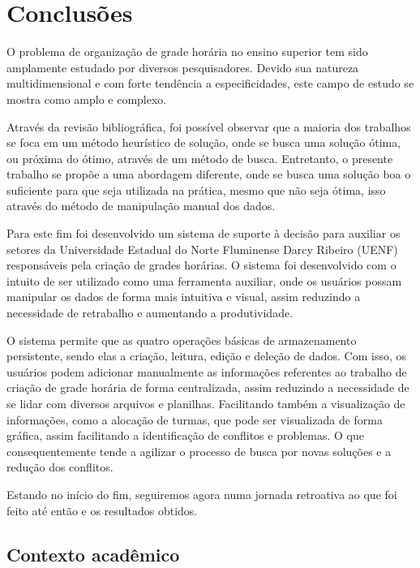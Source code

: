 \chapter{Conclusões} \label{chap:conclusoes}


O problema de organização de grade horária no ensino superior tem sido amplamente estudado por diversos pesquisadores. Devido sua natureza multidimensional e com forte tendência a especificidades, este campo de estudo se mostra como amplo e complexo.

Através da revisão bibliográfica, foi possível observar que a maioria dos trabalhos se foca em um método heurístico de solução, onde se busca uma solução ótima, ou próxima do ótimo, através de um método de busca. Entretanto, o presente trabalho se propõe a uma abordagem diferente, onde se busca uma solução boa o suficiente para que seja utilizada na prática, mesmo que não seja ótima, isso através do método de manipulação manual dos dados.

Para este fim foi desenvolvido um sistema de suporte à decisão para auxiliar os setores da Universidade Estadual do Norte Fluminense Darcy Ribeiro (UENF) responsáveis pela criação de grades horárias. O sistema foi desenvolvido com o intuito de ser utilizado como uma ferramenta auxiliar, onde os usuários possam manipular os dados de forma mais intuitiva e visual, assim reduzindo a necessidade de retrabalho e aumentando a produtividade.

O sistema permite que as quatro operações básicas de armazenamento persistente, sendo elas a criação, leitura, edição e deleção de dados. Com isso, os usuários podem adicionar manualmente as informações referentes ao trabalho de criação de grade horária de forma centralizada, assim reduzindo a necessidade de se lidar com diversos arquivos e planilhas. Facilitando também a visualização de informações, como a alocação de turmas, que pode ser visualizada de forma gráfica, assim facilitando a identificação de conflitos e problemas. O que consequentemente tende a agilizar o processo de busca por novas soluções e a redução dos conflitos.



Estando no início do fim, seguiremos agora numa jornada retroativa ao que foi feito até então e os resultados obtidos.

\section{Contexto acadêmico} %

